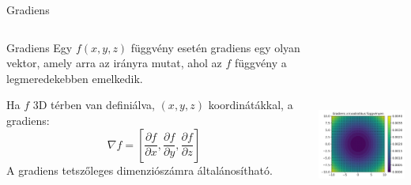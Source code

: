 \documentclass[english, aspectratio=169]{beamer}
\begin{document}
\begin{frame}{Gradiens}
\begin{columns}
\begin{column}{.5\textwidth}
\begin{block}{Gradiens}
Egy $f\left( x,y,z \right)$ függvény esetén gradiens egy olyan vektor, amely arra az irányra mutat, ahol az $f$ függvény a legmeredekebben emelkedik.\par\smallskip
Ha $f$ 3D térben van definiálva, $\left( x,y,z \right)$ koordinátákkal, a gradiens: 
\[
\nabla f = \left[ \frac{\partial f}{\partial x}, \frac{\partial f}{\partial y}, \frac{\partial f}{\partial z} \right]
\]
A gradiens tetszőleges dimenziószámra általánosítható. 
\end{block}
\end{column}
\begin{column}{.5\textwidth}
\begin{center}
\includegraphics[width=7cm, height=7cm, keepaspectratio]{images/regresszio_17.png}
\end{center}
\end{column}
\end{columns}
\end{frame}
\end{document}
